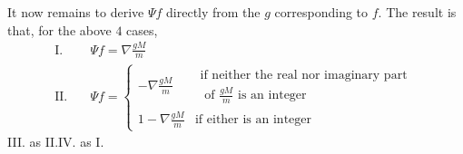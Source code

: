 It now remains to derive $\Psi f$ directly from the $g$ corresponding to $f$. The result is that, for the above $4$ cases,
\[
\begin{aligned}
\mathrm{I.}\quad&\Psi f=\nabla\frac{gM}{m}\\
\mathrm{II.}\quad&\Psi f=\left\{\begin{array}{ll}
-\nabla\frac{gM}{m}&\begin{gathered}\text{if neither the real nor imaginary part}\\\text{ of }\frac{gM}{m}\text{ is an integer}\end{gathered}\\
1-\nabla\frac{gM}{m}&\text{if either is an integer}
\end{array}\right.
\end{aligned}
\]
III. as II.\quad IV. as I.
